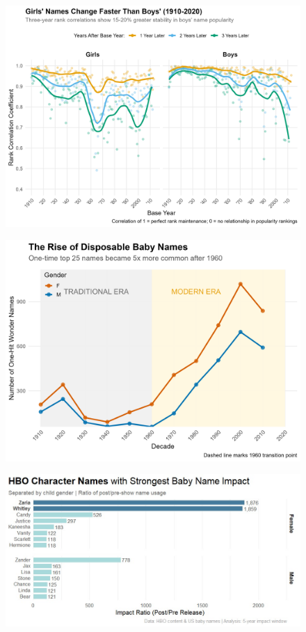 \documentclass[
  man,floatsintext]{apa6}
\begin{document}
\begin{figure}
\includegraphics[width=0.9\linewidth]{../Question1/Results/namepopularity} \caption{ }\label{fig:bubble-image-3}
\end{figure}
\begin{figure}
\includegraphics[width=0.9\linewidth]{../Question1/Results/fadsonewonders} \caption{ }\label{fig:bubble-image-4}
\end{figure}
\begin{figure}
\includegraphics[width=0.9\linewidth]{../Question1/Results/mediaimpact} \caption{ }\label{fig:bubble-image-5}
\end{figure}
\end{document}
